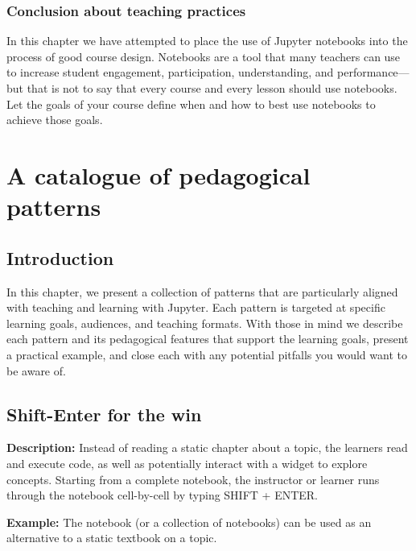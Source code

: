 \documentclass[]{book}
\begin{document}
\hypertarget{conclusion-about-teaching-practices}{%
\subsection{Conclusion about teaching practices}\label{conclusion-about-teaching-practices}}

In this chapter we have attempted to place the use of Jupyter notebooks into the
process of good course design. Notebooks are a tool that many teachers can use
to increase student engagement, participation, understanding, and performance---but
that is not to say that every course and every lesson should use notebooks.
Let the goals of your course define when and how to best use notebooks to
achieve those goals.

\hypertarget{catalogue}{%
\chapter{A catalogue of pedagogical patterns}\label{catalogue}}

\hypertarget{introduction-1}{%
\section{Introduction}\label{introduction-1}}

In this chapter, we present a collection of patterns that are
particularly aligned with teaching and learning with Jupyter. Each
pattern is targeted at specific learning goals, audiences, and
teaching formats. With those in mind we describe each pattern and its
pedagogical features that support the learning goals, present a
practical example, and close each with any potential pitfalls you
would want to be aware of.

\hypertarget{shift-enter-for-the-win}{%
\section{Shift-Enter for the win}\label{shift-enter-for-the-win}}

\textbf{Description:}
Instead of reading a static chapter about a topic, the learners read
and execute code, as well as potentially interact with a widget to
explore concepts. Starting from a complete notebook, the instructor or
learner runs through the notebook cell-by-cell by typing SHIFT + ENTER.

\textbf{Example:}
The notebook (or a collection of notebooks) can be used as an
alternative to a static textbook on a topic.
\end{document}
